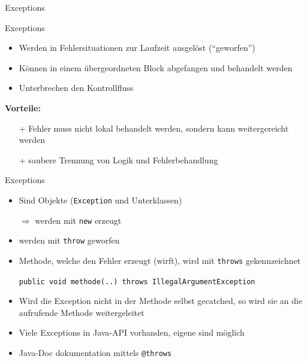 \documentclass[18pt]{beamer}
\begin{document}
\begin{frame}{Exceptions}
	\begin{block}{Exceptions}
    \begin{itemize}
      \item Werden in Fehlersituationen zur Laufzeit ausgelöst ("`geworfen"')
      \item Können in einem übergeordneten Block abgefangen und behandelt werden
      \item Unterbrechen den Kontrollfluss
    \end{itemize}
  \end{block}
  \textbf{Vorteile:}
  \begin{itemize}
    \item[+] Fehler muss nicht lokal behandelt werden, sondern kann weitergereicht werden
    \item[+] saubere Trennung von Logik und Fehlerbehandlung
  \end{itemize}
\end{frame}

\begin{frame}{Exceptions}
	\begin{itemize}
    \item Sind Objekte (\lstinline$Exception$ und Unterklassen)
    \item[] $\Rightarrow$ werden mit \lstinline$new$ erzeugt
    \pause
    \item werden mit \lstinline$throw$ geworfen
    \pause
    \item Methode, welche den Fehler erzeugt (wirft), wird mit \lstinline$throws$ gekennzeichnet
    \item[] \lstinline$public void methode(..) throws IllegalArgumentException$
    \pause
    \item Wird die Exception nicht in der Methode selbst gecatched, so wird sie an die aufrufende Methode weitergeleitet
    \pause
    \item Viele Exceptions in Java-API vorhanden, eigene sind möglich
    \item Java-Doc dokumentation mittels \lstinline$@throws$
  \end{itemize}
\end{frame}
\end{document}
